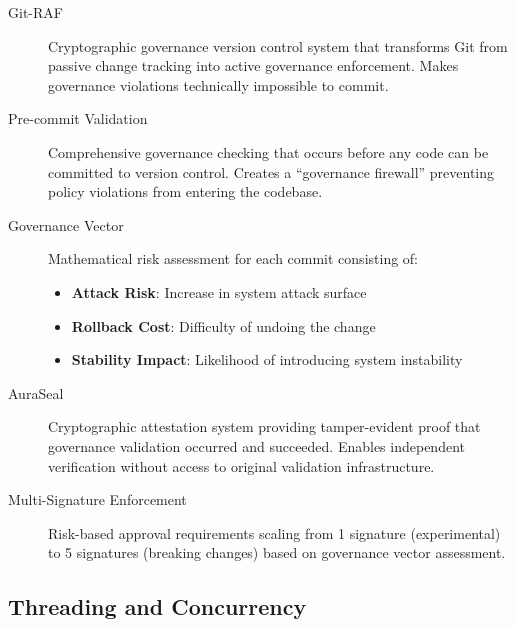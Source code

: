 \begin{description}
\item[Git-RAF] Cryptographic governance version control system that transforms Git from passive change tracking into active governance enforcement. Makes governance violations technically impossible to commit.

\item[Pre-commit Validation] Comprehensive governance checking that occurs before any code can be committed to version control. Creates a ``governance firewall'' preventing policy violations from entering the codebase.

\item[Governance Vector] Mathematical risk assessment for each commit consisting of:
\begin{itemize}
\item \textbf{Attack Risk}: Increase in system attack surface
\item \textbf{Rollback Cost}: Difficulty of undoing the change
\item \textbf{Stability Impact}: Likelihood of introducing system instability
\end{itemize}

\item[AuraSeal] Cryptographic attestation system providing tamper-evident proof that governance validation occurred and succeeded. Enables independent verification without access to original validation infrastructure.

\item[Multi-Signature Enforcement] Risk-based approval requirements scaling from 1 signature (experimental) to 5 signatures (breaking changes) based on governance vector assessment.
\end{description}

\subsection*{Threading and Concurrency}


